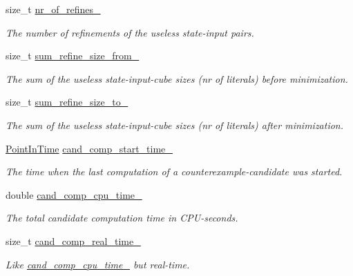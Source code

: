\begin{DoxyCompactItemize}
size\-\_\-t \hyperlink{classLearnStatisticsSAT_afa9b3c4bb24e7f6ebd9593dfb916c11e}{nr\-\_\-of\-\_\-refines\-\_\-}
\begin{DoxyCompactList}\small\item\em The number of refinements of the useless state-\/input pairs. \end{DoxyCompactList}\item 
size\-\_\-t \hyperlink{classLearnStatisticsSAT_a7f36ead437ee4833c96342d812551cce}{sum\-\_\-refine\-\_\-size\-\_\-from\-\_\-}
\begin{DoxyCompactList}\small\item\em The sum of the useless state-\/input-\/cube sizes (nr of literals) before minimization. \end{DoxyCompactList}\item 
size\-\_\-t \hyperlink{classLearnStatisticsSAT_ab64cce193c819cdd5c3a6838d99eb0a7}{sum\-\_\-refine\-\_\-size\-\_\-to\-\_\-}
\begin{DoxyCompactList}\small\item\em The sum of the useless state-\/input-\/cube sizes (nr of literals) after minimization. \end{DoxyCompactList}\item 
\hyperlink{Stopwatch_8h_af3a9f634f27bed7e98dbc23e5c6f807d}{Point\-In\-Time} \hyperlink{classLearnStatisticsSAT_a73f2f0e2ee619df05b22261e7b691320}{cand\-\_\-comp\-\_\-start\-\_\-time\-\_\-}
\begin{DoxyCompactList}\small\item\em The time when the last computation of a counterexample-\/candidate was started. \end{DoxyCompactList}\item 
double \hyperlink{classLearnStatisticsSAT_af977c00fbf0f9978f92dd5c997577a06}{cand\-\_\-comp\-\_\-cpu\-\_\-time\-\_\-}
\begin{DoxyCompactList}\small\item\em The total candidate computation time in C\-P\-U-\/seconds. \end{DoxyCompactList}\item 
size\-\_\-t \hyperlink{classLearnStatisticsSAT_a278872231b15ff010ae4e3a60e8d8f11}{cand\-\_\-comp\-\_\-real\-\_\-time\-\_\-}
\begin{DoxyCompactList}\small\item\em Like \hyperlink{classLearnStatisticsSAT_af977c00fbf0f9978f92dd5c997577a06}{cand\-\_\-comp\-\_\-cpu\-\_\-time\-\_\-} but real-\/time. \end{DoxyCompactList}\item 

\end{DoxyCompactItemize}

